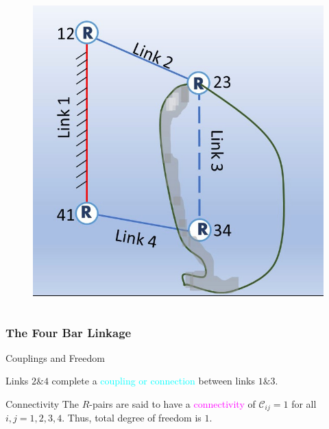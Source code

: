 \begin{frame}
\begin{tcolorbox}[colframe=blue!80!green, title=A (Hacked) Four-Bar Linkage, coltitle=white!80,toggle enlargement=none]
\begin{columns}[b]
\begin{column}{.45\linewidth}
\begin{figure}
			\includegraphics[width=\textwidth]{figures/4bardual.jpg}
			\end{figure}
		\end{column}	
		\end{columns}
	\end{tcolorbox}
	\label{fig:4bar}
\end{frame}


\begin{frame}
	\frametitle{The Four Bar Linkage}
	\begin{block}{Couplings and Freedom}
		
		Links $2 \& 4$ complete a \textcolor{cyan}{coupling or connection} between links $1 \& 3$. 
	\end{block}
	\begin{block}{Connectivity}
		The $R$-pairs are said to have a \textcolor{magenta}{connectivity} of  $\mathscr{C}_{ij}=1$ for all $i,j=1,2,3,4$. Thus, total degree of freedom is $1$.
	\end{block}
\end{frame}

